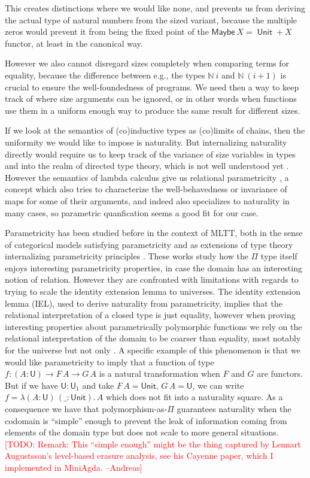 \documentclass{book}
\newcommand{\TODO}[1]{\textcolor{red}{[TODO: #1]}}
\DeclareMathOperator{\Unit}{\mathsf{Unit}}
\newcommand{\U}{\mathsf{U}}
\newcommand{\sd}{.\,}
\newcommand{\sNat}{\mathbb{N}}
\begin{document}
This creates distinctions where we would like none, and prevents us
from deriving the actual type of natural numbers from the sized
variant, because the multiple zeros would prevent it from being the
fixed point of the $\mathsf{Maybe}~X = \Unit + X$ functor,
at least in the canonical way.

However we also cannot disregard sizes completely when comparing terms
for equality, because the difference between e.g., the types $\sNat~i$ and
$\sNat~(i+1)$ is crucial to ensure the well-foundedness of programs.
We need then a way to keep track of where size arguments can be
ignored, or in other words when functions use them in a uniform enough
way to produce the same result for different sizes.

If we look at the semantics of (co)inductive types as (co)limits of
chains, then the uniformity we would like to impose is naturality. But
internalizing naturality directly would require us to keep track of
the variance of size variables in types and into the realm of directed
type theory, which is not well understood yet \cite{licataHarper:mfps11,
  riehlShulman:typeTheoryInfinityCategories}. However the semantics of lambda calculus give us
relational parametricity \cite{reynolds:ifip83}, a concept which also
tries to characterize the well-behavedness or invariance of maps for
some of their arguments, and indeed also specializes to naturality in
many cases, so parametric quanfication seems a good fit for our
case.


Parametricity has been studied before in the context of MLTT,
both in the sense of categorical models satisfying parametricity
\cite{atkeyGhaniJohann:popl14} and as extensions of type theory
internalizing parametricity principles \cite{moulin:mfps15}.
These works study how the $\Pi$ type itself enjoys interesting
parametricity properties, in case the domain has an interesting notion
of relation. However they are confronted with limitations with regards
to trying to scale the identity extension lemma to universes.
The identity extension lemma (IEL)\cite{reynolds:ifip83}, used to derive naturality from
parametricity, implies that the relational interpretation of a closed
type is just equality, however when proving interesting properties
about parametrically polymorphic functions we rely on the relational
interpretation of the domain to be coarser than equality, most notably
for the universe but not only \cite{atkey:algebraic-indexed}.
A specific example of this phenomenon is that we would like
parametricity to imply that a function of type $f : (A : \U) \to F\,A
\to G\,A$ is a natural transformation when $F$ and $G$ are
functors. But if we have $\U : \U_1$ and take $F\,A = \mathsf{Unit}$,
$G\,A = \U$, we can write $f = \lambda (A : \U)\, (\_ :
\mathsf{Unit})\sd A$ which does not fit into a naturality square.
As a consequence we have that polymorphism-as-$\Pi$ guarantees
naturality when the codomain is ``simple'' enough to prevent the leak
of information coming from elements of the domain type but does not
scale to more general situations.
\TODO{Remark: This ``simple enough'' might be the thing captured by
  Lennart Augustsson's level-based erasure analysis, see his Cayenne
  paper, which I implemented in MiniAgda. --Andreas}
\end{document}
